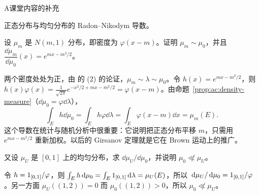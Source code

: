 \begin{exercises}{A}{课堂内容的补充}
\item\label{ex:ac:A6} 正态分布与均匀分布的 Radon--Nikodym 导数。
\begin{questions}
\item 设 $\mu_m$ 是 $N(m,1)$ 分布，即密度为 $\varphi(x-m)$。证明 $\mu_m\sim\mu_0$，并且 $\dfrac{\dd\mu_m}{\dd\mu_0}(x)=e^{mx-m^2/2}$。
\begin{solution}
两个密度处处为正，由 的 (2) 的论证，$\mu_m\sim\lambda\sim\mu_0$。令 $h(x)=e^{mx-m^2/2}$，则 $h(x)\varphi(x)=\frac1{\sqrt{2\pi}}e^{-x^2/2+mx-m^2/2}=\varphi(x-m)$。由命题~\ref{prop:ac:density-measure}（$\dd\mu_0=\varphi\dd\lambda$），
\[
\int_Eh\dd\mu_0=\int_Eh\varphi\dd\lambda=\int_E\varphi(x-m)\dd x=\mu_m(E).
\]
这个导数在统计与随机分析中很重要：它说明把正态分布平移 $m$，只需用 $e^{mx-m^2/2}$ 重新加权。以后的 Girsanov 定理就是它在 Brown 运动上的推广。
\end{solution}
\item 又设 $\mu_U$ 是 $[0,1]$ 上的均匀分布，求 $\dd\mu_U/\dd\mu_0$，并说明 $\mu_0\not\ll\mu_U$。
\begin{solution}
令 $h=1_{[0,1]}/\varphi$，则 $\int_Eh\,\mathrm{d}\mu_0=\int_E1_{[0,1]}\,\mathrm{d}\lambda=\mu_U(E)$，所以 $\,\mathrm{d}\mu_U/\,\mathrm{d}\mu_0=1_{[0,1]}/\varphi$。另一方面 $\mu_U((1,2))=0$ 而 $\mu_0((1,2))>0$，所以 $\mu_0\not\ll\mu_U$。
\end{solution}
\end{questions}


\end{exercises}
